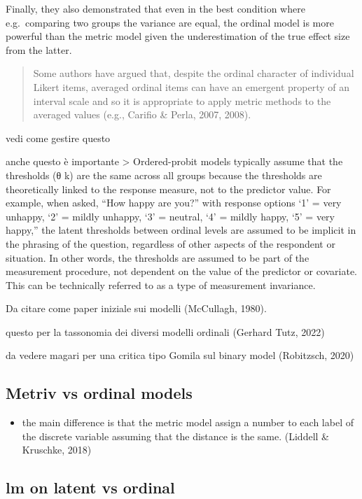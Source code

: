\documentclass[
  man,floatsintext]{apa6}
\providecommand{\tightlist}{%
  \setlength{\itemsep}{0pt}\setlength{\parskip}{0pt}}
\begin{document}
Finally, they also demonstrated that even in the best condition where e.g.~comparing two groups the variance are equal, the ordinal model is more powerful than the metric model given the underestimation of the true effect size from the latter.

\begin{quote}
Some authors have argued that, despite the ordinal character of individual Likert items, averaged ordinal items can have an emergent property of an interval scale and so it is appropriate to apply metric methods to the averaged values (e.g., Carifio \& Perla, 2007, 2008).
\end{quote}

vedi come gestire questo

anche questo è importante
\textgreater{} Ordered-probit models typically assume that the thresholds (θ k) are the same across all groups because the thresholds are theoretically linked to the response measure, not to the predictor value. For example, when asked, ``How happy are you?'' with response options `1' = very unhappy, `2' = mildly unhappy, `3' = neutral, `4' = mildly happy, `5' = very happy,'' the latent thresholds between ordinal levels are assumed to be implicit in the phrasing of the question, regardless of other aspects of the respondent or situation. In other words, the thresholds are assumed to be part of the measurement procedure, not dependent on the value of the predictor or covariate. This can be technically referred to as a type of measurement invariance.

Da citare come paper iniziale sui modelli (McCullagh, 1980).

questo per la tassonomia dei diversi modelli ordinali (Gerhard Tutz, 2022)

da vedere magari per una critica tipo Gomila sul binary model (Robitzsch, 2020)

\subsection{Metriv vs ordinal models}\label{metriv-vs-ordinal-models}

\begin{itemize}
\tightlist
\item
  the main difference is that the metric model assign a number to each label of the discrete variable assuming that the distance is the same. (Liddell \& Kruschke, 2018)
\end{itemize}

\subsection{lm on latent vs ordinal}\label{lm-on-latent-vs-ordinal}
\end{document}
